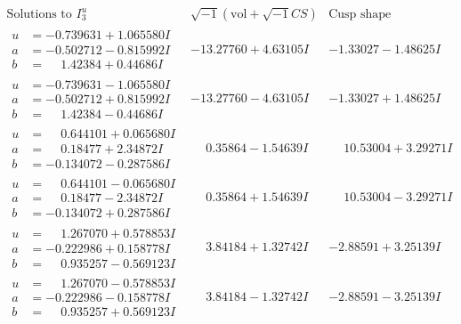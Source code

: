 \documentclass[1p]{elsarticle_modified}
\theoremstyle{definition}
\newcommand{\I}{\sqrt{-1}}
\begin{document}
$$\begin{array}{c|c|c}  
\text{Solutions to }I^u_{3}& \I (\text{vol} + \sqrt{-1}CS) & \text{Cusp shape}\\
 \hline 
\begin{aligned}
u &= -0.739631 + 1.065580 I \\
a &= -0.502712 - 0.815992 I \\
b &= \phantom{-}1.42384 + 0.44686 I\end{aligned}
 & -13.27760 + 4.63105 I & -1.33027 - 1.48625 I \\ \hline\begin{aligned}
u &= -0.739631 - 1.065580 I \\
a &= -0.502712 + 0.815992 I \\
b &= \phantom{-}1.42384 - 0.44686 I\end{aligned}
 & -13.27760 - 4.63105 I & -1.33027 + 1.48625 I \\ \hline\begin{aligned}
u &= \phantom{-}0.644101 + 0.065680 I \\
a &= \phantom{-}0.18477 + 2.34872 I \\
b &= -0.134072 - 0.287586 I\end{aligned}
 & \phantom{-}0.35864 - 1.54639 I & \phantom{-}10.53004 + 3.29271 I \\ \hline\begin{aligned}
u &= \phantom{-}0.644101 - 0.065680 I \\
a &= \phantom{-}0.18477 - 2.34872 I \\
b &= -0.134072 + 0.287586 I\end{aligned}
 & \phantom{-}0.35864 + 1.54639 I & \phantom{-}10.53004 - 3.29271 I \\ \hline\begin{aligned}
u &= \phantom{-}1.267070 + 0.578853 I \\
a &= -0.222986 + 0.158778 I \\
b &= \phantom{-}0.935257 - 0.569123 I\end{aligned}
 & \phantom{-}3.84184 + 1.32742 I & -2.88591 + 3.25139 I \\ \hline\begin{aligned}
u &= \phantom{-}1.267070 - 0.578853 I \\
a &= -0.222986 - 0.158778 I \\
b &= \phantom{-}0.935257 + 0.569123 I\end{aligned}
 & \phantom{-}3.84184 - 1.32742 I & -2.88591 - 3.25139 I \\ \hline\begin{aligned}

\end{aligned}
\end{array}$$
\end{document}
